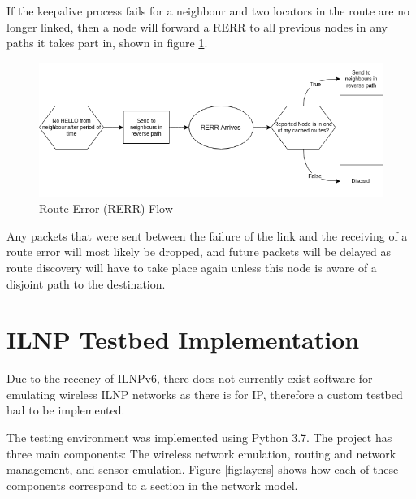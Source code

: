 \documentclass[12pt]{article}
\begin{document}
If the keepalive process fails for a neighbour and two locators in the route are no longer linked, then a node will forward a RERR to all previous nodes in any paths it takes part in, shown in figure \ref{fig:rerrflow}.

\begin{figure}[h]
	\centering
	\includegraphics[width=\linewidth]{images/rerrflow}
	\caption{Route Error (RERR) Flow}
	\label{fig:rerrflow}
\end{figure}

Any packets that were sent between the failure of the link and the receiving of a route error will most likely be dropped, and future packets will be delayed as route discovery will have to take place again unless this node is aware of a disjoint path to the destination.

\FloatBarrier
\pagebreak
\section{ILNP Testbed Implementation}

Due to the recency of ILNPv6, there does not currently exist software for emulating wireless ILNP networks as there is for IP, therefore a custom testbed had to be implemented.  

The testing environment was implemented using Python 3.7. The project has three main components: The wireless network emulation, routing and network management, and sensor emulation. Figure \ref{fig:layers} shows how each of these components correspond to a section in the network model.
\end{document}
